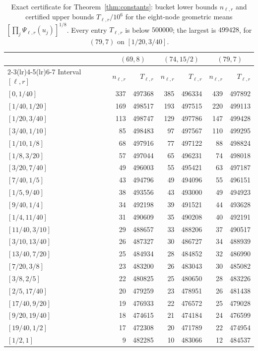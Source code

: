 \documentclass[11pt,a4paper]{article}
\theoremstyle{definition}
\theoremstyle{remark}
\newcommand{\1}{\mathbf 1}
\begin{document}
\begin{table}[ht]
\centering\small
\begin{tabular}{l rr rr rr}
\toprule
& \multicolumn{2}{c}{$(69,8)$} & \multicolumn{2}{c}{$(74,15/2)$}
& \multicolumn{2}{c}{$(79,7)$}\\
\cmidrule(lr){2-3}\cmidrule(lr){4-5}\cmidrule(lr){6-7}
Interval $[\ell,r]$ & $n_{\ell,r}$ & $T_{\ell,r}$ & $n_{\ell,r}$ & $T_{\ell,r}$
& $n_{\ell,r}$ & $T_{\ell,r}$\\
\midrule
$[0,1/40]$ & 337 & 497368 & 385 & 496334 & 439 & 497892\\
$[1/40,1/20]$ & 169 & 498517 & 193 & 497515 & 220 & 499113\\
$[1/20,3/40]$ & 113 & 498747 & 129 & 497786 & 147 & 499428\\
$[3/40,1/10]$ & 85 & 498483 & 97 & 497567 & 110 & 499295\\
$[1/10,1/8]$ & 68 & 497916 & 77 & 497122 & 88 & 498824\\
$[1/8,3/20]$ & 57 & 497044 & 65 & 496231 & 74 & 498018\\
$[3/20,7/40]$ & 49 & 496003 & 55 & 495421 & 63 & 497187\\
$[7/40,1/5]$ & 43 & 494796 & 49 & 494096 & 55 & 496151\\
$[1/5,9/40]$ & 38 & 493556 & 43 & 493000 & 49 & 494923\\
$[9/40,1/4]$ & 34 & 492198 & 39 & 491521 & 44 & 493628\\
$[1/4,11/40]$ & 31 & 490609 & 35 & 490208 & 40 & 492191\\
$[11/40,3/10]$ & 29 & 488657 & 33 & 488206 & 37 & 490517\\
$[3/10,13/40]$ & 26 & 487327 & 30 & 486727 & 34 & 488939\\
$[13/40,7/20]$ & 25 & 484934 & 28 & 484852 & 32 & 486990\\
$[7/20,3/8]$ & 23 & 483200 & 26 & 483043 & 30 & 485082\\
$[3/8,2/5]$ & 22 & 480825 & 25 & 480650 & 28 & 483226\\
$[2/5,17/40]$ & 20 & 479259 & 23 & 478951 & 26 & 481438\\
$[17/40,9/20]$ & 19 & 476933 & 22 & 476572 & 25 & 479028\\
$[9/20,19/40]$ & 18 & 474615 & 21 & 474184 & 24 & 476599\\
$[19/40,1/2]$ & 17 & 472308 & 20 & 471789 & 22 & 474954\\
$[1/2,1]$ & 9 & 482285 & 10 & 483066 & 12 & 484537\\
\bottomrule
\end{tabular}
\caption{Exact certificate for Theorem~\ref{thm:constants}: bucket lower
bounds $n_{\ell,r}$ and certified upper bounds $T_{\ell,r}/10^6$ for the
eight-node geometric means $[\prod_j\Psi_{\ell,r}(u_j)]^{1/8}$. Every
entry $T_{\ell,r}$ is below $500000$; the largest is $499428$, for
$(79,7)$ on $[1/20,3/40]$.}
\label{tab:cert}
\end{table}
\end{document}
